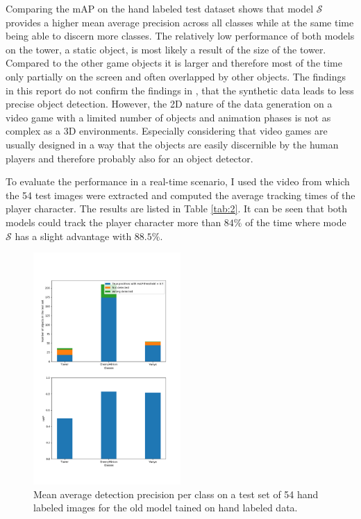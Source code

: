 Comparing the mAP on the hand labeled test dataset shows that model $\mathcal{S}$ provides a higher mean average precision across all classes while at the same time being able to discern more classes.
The relatively low performance of both models on the tower, a static object, is most likely a result of the size of the tower.
Compared to the other game objects it is larger and therefore most of the time only partially on the screen and often overlapped by other objects.
The findings in this report do not confirm the findings in \cite{rajpura2017object}, that the synthetic data leads to less precise object detection.
However, the 2D nature of the data generation on a video game with a limited number of objects and animation phases is not as complex as a 3D environments.
Especially considering that video games are usually designed in a way that the objects are easily discernible by the human players and therefore probably also for an object detector.

To evaluate the performance in a real-time scenario, I used the video from which the 54 test images were extracted and computed the average tracking times of the player character.
The results are listed in Table \ref{tab:2}.
It can be seen that both models could track the player character more than $84\%$ of the time where mode $\mathcal{S}$ has a slight advantage with $88.5\%$.
\begin{figure}[H]
\includegraphics[width=0.5\textwidth]{figures/old.png}
\caption{Mean average detection precision per class on a test set of 54 hand labeled images for the old model tained on hand labeled data.}
\label{fig:results_old}
\end{figure}

